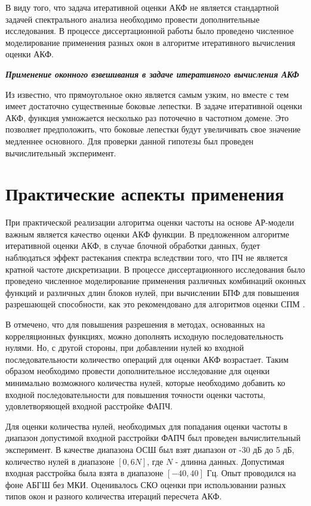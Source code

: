 В виду того, что задача итеративной оценки АКФ не является стандартной задачей спектрального анализа необходимо провести дополнительные исследования. В процессе
диссертационной работы было проведено численное моделирование применения разных окон в алгоритме итеративного вычисления оценки АКФ.

{\bf{\textit{Применение оконного взвешивания в задаче итеративного вычисления АКФ}}}

Из \cite{bolshakov-book} известно, что прямоугольное окно является самым узким, но вместе с тем имеет достаточно существенные боковые лепестки. В задаче итеративной оценки
АКФ, функция умножается несколько раз поточечно в частотном домене. Это позволяет предположить, что боковые лепестки будут увеличивать свое значение медленнее основного.
Для проверки данной гипотезы был проведен вычислительный эксперимент.

\section{Практические аспекты применения}
\label{lab:sec2_windows}

При практической реализации алгоритма оценки частоты на основе АР-модели важным является качество оценки АКФ функции. В предложенном алгоритме итеративной оценки АКФ,
в случае блочной обработки данных, будет наблюдаться эффект растекания спектра вследствии того, что ПЧ не является кратной частоте дискретизации. В процессе диссертационного
исследования было проведено численное моделирование применения различных комбинаций оконных функций и различных длин блоков нулей, при вычислении БПФ для повышения
разрешающей способности, как это рекомендовано для алгоритмов оценки СПМ \cite{bolshakov-book}.

В \cite{bolshakov-book} отмечено, что для повышения разрешения в методах, основанных на корреляционных функциях, можно дополнять исходную последовательность нулями.
Но, с другой стороны, при добавлении нулей ко входной последовательности количество операций для оценки АКФ возрастает. Таким образом необходимо провести дополнительное
исследование для оценки минимально возможного количества нулей, которые необходимо добавить ко входной последовательности для повышения точности оценки частоты,
удовлетворяющей входной расстройке ФАПЧ.

Для оценки количества нулей, необходимых для попадания оценки частоты в диапазон допустимой входной расстройки ФАПЧ был проведен вычислительный эксперимент. В качестве диапазона
ОСШ был взят диапазон от -30 дБ до 5 дБ, количество нулей в диапазоне ${[0, 6N]}$, где ${N}$ - длинна данных. Допустимая входная расстройка была взята в диапазоне ${[-40, 40]}$ Гц.
Опыт проводился на фоне АБГШ без МКИ. Оценивалось СКО оценки при использовании разных типов окон и разного количества итераций пересчета АКФ.


